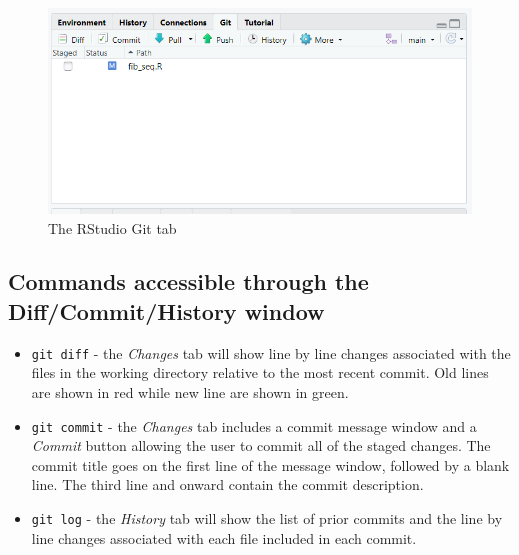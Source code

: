 \documentclass[
  letterpaper,
  DIV=11,
  numbers=noendperiod]{scrreprt}
\begin{document}
\begin{figure}

{\centering \includegraphics{Rstudio_Git.PNG}

}

\caption{The RStudio Git tab}

\end{figure}

\hypertarget{commands-accessible-through-the-diffcommithistory-window}{%
\subsection{Commands accessible through the Diff/Commit/History
window}\label{commands-accessible-through-the-diffcommithistory-window}}

\begin{itemize}
\item
  \texttt{git\ diff} - the \emph{Changes} tab will show line by line
  changes associated with the files in the working directory relative to
  the most recent commit. Old lines are shown in red while new line are
  shown in green.
\item
  \texttt{git\ commit} - the \emph{Changes} tab includes a commit
  message window and a \emph{Commit} button allowing the user to commit
  all of the staged changes. The commit title goes on the first line of
  the message window, followed by a blank line. The third line and
  onward contain the commit description.
\item
  \texttt{git\ log} - the \emph{History} tab will show the list of prior
  commits and the line by line changes associated with each file
  included in each commit.
\end{itemize}
\end{document}
